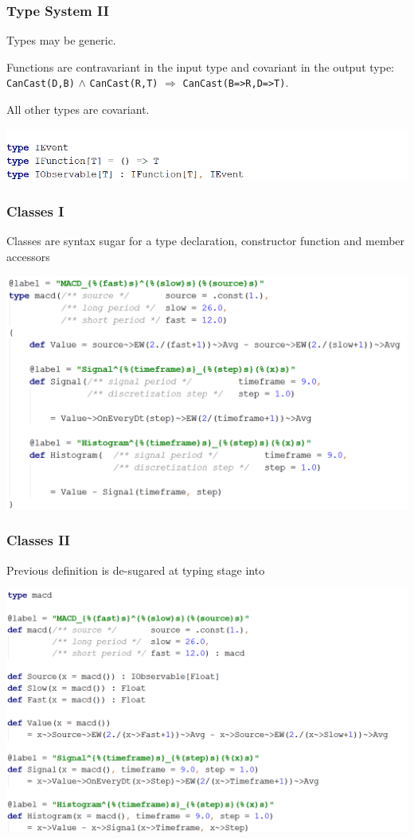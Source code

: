 \documentclass{beamer}
\begin{document}
\begin{frame}
\frametitle{Type System II}
Types may be generic. 

Functions are contravariant in the input type and covariant in the output type: \texttt{CanCast(D,B)} $\wedge$ \texttt{CanCast(R,T)} $\Rightarrow$ \texttt{CanCast(B=>R,D=>T)}.

All other types are covariant.

\includegraphics[width=1\linewidth]{iobservable.png}

\end{frame}

\begin{frame}
\frametitle{Classes I}
Classes are syntax sugar for a type declaration, constructor function and member accessors

\includegraphics[width=1\linewidth]{macd.png}

\end{frame}
\begin{frame}
\frametitle{Classes II}
Previous definition is de-sugared at typing stage into

\includegraphics[width=1\linewidth]{macd_desugared.png}


\end{frame}
\end{document}

